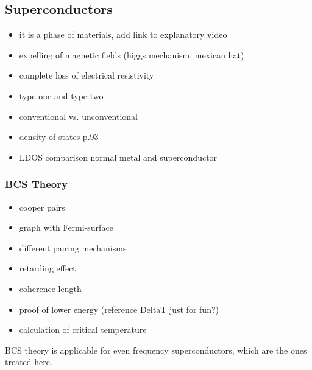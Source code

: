\subsection{Superconductors}

\begin{itemize}
    \item it is a phase of materials, add link to explanatory video
    \item expelling of magnetic fields (higgs mechanism, mexican hat)
    \item complete loss of electrical resistivity 
    \item type one and type two
    \item conventional vs. unconventional \cite{klam_ludwig_unconventional_2010, balatsky2006impurity}
    \item density of states \cite{sudbo_asle_superconductivity_2004} p.93
    \item LDOS comparison normal metal and superconductor 
\end{itemize}

\subsubsection{BCS Theory}\label{sec:BCS}

\begin{itemize}
    \item cooper pairs
    \item graph with Fermi-surface
    \item different pairing mechanisms
    \item retarding effect
    \item coherence length
    \item proof of lower energy (reference DeltaT just for fun?)
    \item calculation of critical temperature \cite{sigrist_manfred_introduction_nodate} \cite{sudbo_asle_superconductivity_2004}
\end{itemize}
BCS theory is applicable for even frequency superconductors, which are the ones treated here.

